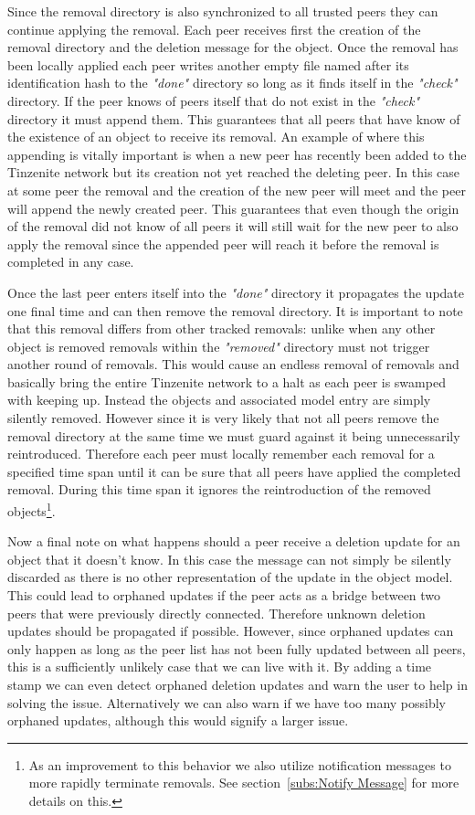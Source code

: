 Since the removal directory is also synchronized to all trusted peers they can continue applying the removal.
Each peer receives first the creation of the removal directory and the deletion message for the object.
Once the removal has been locally applied each peer writes another empty file named after its identification hash to the \textit{"done"} directory so long as it finds itself in the \textit{"check"} directory.
If the peer knows of peers itself that do not exist in the \textit{"check"} directory it must append them.
This guarantees that all peers that have know of the existence of an object to receive its removal.
An example of where this appending is vitally important is when a new peer has recently been added to the Tinzenite network but its creation not yet reached the deleting peer.
In this case at some peer the removal and the creation of the new peer will meet and the peer will append the newly created peer.
This guarantees that even though the origin of the removal did not know of all peers it will still wait for the new peer to also apply the removal since the appended peer will reach it before the removal is completed in any case.

Once the last peer enters itself into the \textit{"done"} directory it propagates the update one final time and can then remove the removal directory.
It is important to note that this removal differs from other tracked removals: unlike when any other object is removed removals within the \textit{"removed"} directory must not trigger another round of removals.
This would cause an endless removal of removals and basically bring the entire Tinzenite network to a halt as each peer is swamped with keeping up.
Instead the objects and associated model entry are simply silently removed.
However since it is very likely that not all peers remove the removal directory at the same time we must guard against it being unnecessarily reintroduced.
Therefore each peer must locally remember each removal for a specified time span until it can be sure that all peers have applied the completed removal.
During this time span it ignores the reintroduction of the removed objects\footnote{As an improvement to this behavior we also utilize notification messages to more rapidly terminate removals. See section~\ref{subs:Notify Message} for more details on this.}.

Now a final note on what happens should a peer receive a deletion update for an object that it doesn't know.
In this case the message can not simply be silently discarded as there is no other representation of the update in the object model.
This could lead to orphaned updates if the peer acts as a bridge between two peers that were previously directly connected.
Therefore unknown deletion updates should be propagated if possible.
However, since orphaned updates can only happen as long as the peer list has not been fully updated between all peers, this is a sufficiently unlikely case that we can live with it.
By adding a time stamp we can even detect orphaned deletion updates and warn the user to help in solving the issue.
Alternatively we can also warn if we have too many possibly orphaned updates, although this would signify a larger issue.


